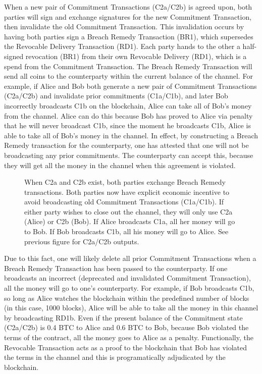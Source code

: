 \documentclass[letterpaper,11pt]{article}
\begin{document}
When a new pair of Commitment Transactions (C2a/C2b) is agreed upon, both
parties will sign and exchange signatures for the new Commitment Transaction,
then invalidate the old Commitment Transaction. This invalidation occurs by
having both parties sign a Breach Remedy Transaction (BR1), which supersedes the
Revocable Delivery Transaction (RD1). Each party hands to the other a
half-signed revocation (BR1) from their own Revocable Delivery (RD1), which is a
spend from the Commitment Transaction. The Breach Remedy Transaction will send
all coins to the counterparty within the current balance of the channel. For
example, if Alice and Bob both generate a new pair of Commitment Transactions
(C2a/C2b) and invalidate prior commitments (C1a/C1b), and later Bob incorrectly
broadcasts C1b on the blockchain, Alice can take all of Bob's money from the
channel. Alice can do this because Bob has proved to Alice via penalty that he
will never broadcast C1b, since the moment he broadcasts C1b, Alice is able to
take all of Bob's money in the channel. In effect, by constructing a Breach
Remedy transaction for the counterparty, one has attested that one will not be
broadcasting any prior commitments. The counterparty can accept this, because
they will get all the money in the channel when this agreement is violated.

\begin{figure}[H]
	\caption{
		When C2a and C2b exist, both parties exchange Breach Remedy
		transactions. Both parties now have explicit economic incentive
		to avoid broadcasting old Commitment Transactions (C1a/C1b).
		If either party wishes to close out the channel, they will only
		use C2a (Alice) or C2b (Bob). If Alice broadcasts C1a, all her
		money will go to Bob. If Bob broadcasts C1b, all his money will
		go to Alice. See previous figure for C2a/C2b outputs.
	}
\end{figure}

Due to this fact, one will likely delete all prior Commitment Transactions when
a Breach Remedy Transaction has been passed to the counterparty. If one
broadcasts an incorrect (deprecated and invalidated Commitment Transaction), all
the money will go to one's counterparty. For example, if Bob broadcasts C1b, so
long as Alice watches the blockchain within the predefined number of blocks (in
this case, 1000 blocks), Alice will be able to take all the money in this
channel by broadcasting RD1b. Even if the present balance of the Commitment
state (C2a/C2b) is 0.4 BTC to Alice and 0.6 BTC to Bob, because Bob violated the
terms of the contract, all the money goes to Alice as a penalty. Functionally,
the Revocable Transaction acts as a proof to the blockchain that Bob has
violated the terms in the channel and this is programatically adjudicated by the
blockchain.
\end{document}
